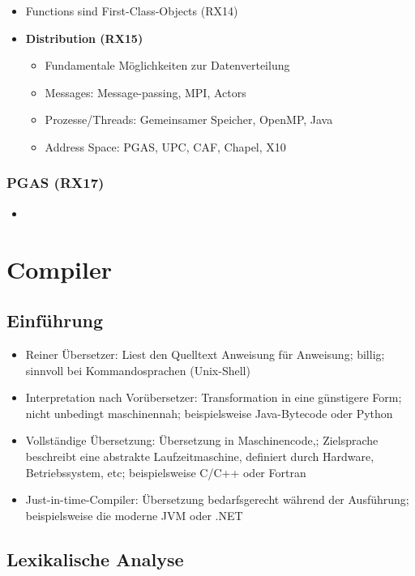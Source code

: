 \begin{itemize}
	\item Functions sind First-Class-Objects (RX14)
	\item \textbf{Distribution (RX15)}
	\begin{itemize}
		\item Fundamentale Möglichkeiten zur Datenverteilung
		\item Messages: Message-passing, MPI, Actors
		\item Prozesse/Threads: Gemeinsamer Speicher, OpenMP, Java
		\item Address Space: PGAS, UPC, CAF, Chapel, X10
	\end{itemize}
\end{itemize}

\subsubsection{PGAS (RX17)}
\begin{itemize}
	\item 
\end{itemize}


\section{Compiler}

\subsection{Einführung}
\begin{itemize}
	\item Reiner Übersetzer: Liest den Quelltext Anweisung für Anweisung; billig; sinnvoll bei Kommandosprachen (Unix-Shell)
	\item Interpretation nach Vorübersetzer: Transformation in eine günstigere Form; nicht unbedingt maschinennah; beispielsweise Java-Bytecode oder Python
	\item Vollständige Übersetzung: Übersetzung in Maschinencode,; Zielsprache beschreibt eine abstrakte Laufzeitmaschine, definiert durch Hardware, Betriebssystem, etc; beispielsweise C/C++ oder Fortran
	\item Just-in-time-Compiler: Übersetzung bedarfsgerecht während der Ausführung; beispielsweise die moderne JVM oder .NET
\end{itemize}


\subsection{Lexikalische Analyse}


